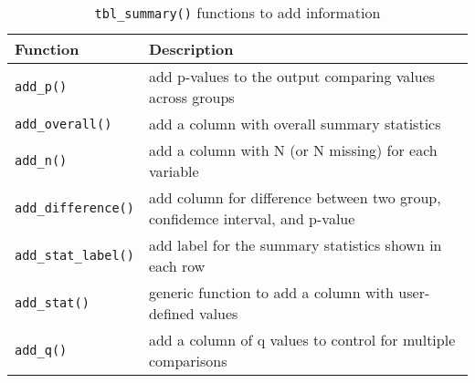 \captionsetup[table]{labelformat=empty,skip=1pt}
\begin{longtable}{ll}
\caption{\label{tab:}\texttt{tbl_summary()} functions to add information}\\
\toprule
Function & Description \\ 
\midrule
\texttt{add\_p()} & add p-values to the output comparing values across groups \\ 
\texttt{add\_overall()} & add a column with overall summary statistics \\ 
\texttt{add\_n()} & add a column with N (or N missing) for each variable \\ 
\texttt{add\_difference()} & add column for difference between two group, confidemce interval, and p-value \\ 
\texttt{add\_stat\_label()} & add label for the summary statistics shown in each row \\ 
\texttt{add\_stat()} & generic function to add a column with user-defined values \\ 
\texttt{add\_q()} & add a column of q values to control for multiple comparisons \\ 
\bottomrule
\end{longtable}

